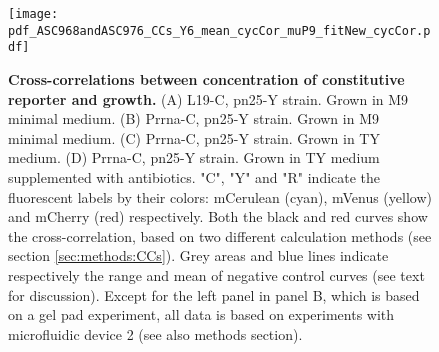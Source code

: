 \begin{figure}
    \centering
    \texttt{[image: pdf\_ASC968andASC976\_CCs\_Y6\_mean\_cycCor\_muP9\_fitNew\_cycCor.pdf]}
    \caption{ 
        \textbf{Cross-correlations between concentration of constitutive reporter and growth.}
        (A) L19-C, pn25-Y strain. Grown in M9 minimal medium.
        (B) Prrna-C, pn25-Y strain. Grown in M9 minimal medium.         
        (C) Prrna-C, pn25-Y strain. Grown in TY medium.
        (D) Prrna-C, pn25-Y strain. Grown in TY medium supplemented with antibiotics.
        "C", "Y" and "R" indicate the fluorescent labels by their colors: mCerulean (cyan), mVenus (yellow) and mCherry (red) respectively.
        Both the black and red curves show the cross-correlation, based on two different calculation methods (see section \ref{sec:methods:CCs}).
        Grey areas and blue lines indicate respectively the range and mean of negative control curves (see text for discussion).        
        Except for the left panel in panel B, which is based on a gel pad experiment, all data is based on experiments with microfluidic device 2 (see also methods section).
    }
    \label{fig:ribo:CCsEmuYpn25}
\end{figure}

